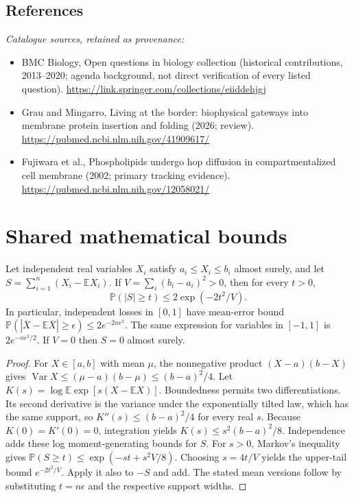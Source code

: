 \documentclass[11pt]{article}
\begin{document}
\subsection{References}
\noindent\emph{Catalogue sources, retained as provenance:}
\begin{itemize}
\item BMC Biology, Open questions in biology collection (historical contributions, 2013--2020; agenda background, not direct verification of every listed question). \url{https://link.springer.com/collections/eiiddehjgj}
\item Grau and Mingarro, Living at the border: biophysical gateways into membrane protein insertion and folding (2026; review). \url{https://pubmed.ncbi.nlm.nih.gov/41909617/}
\item Fujiwara et al., Phospholipids undergo hop diffusion in compartmentalized cell membrane (2002; primary tracking evidence). \url{https://pubmed.ncbi.nlm.nih.gov/12058021/}
\end{itemize}




\section{Shared mathematical bounds}\label{app:bounds}
\begin{lemma}\label{lem:bounded}
Let independent real variables $X_i$ satisfy $a_i\leq X_i\leq b_i$ almost surely,
and let $S=\sum_{i=1}^n(X_i-\mathbb{E} X_i)$. If
$V=\sum_i(b_i-a_i)^2>0$, then for every $t>0$,
\[
 \mathbb{P}(|S|\geq t)\leq 2\exp(-2t^2/V).
\]
In particular, independent losses in $[0,1]$ have mean-error bound
$\mathbb{P}(|\overline X-\mathbb{E}\overline X|\geq\epsilon)
\leq2e^{-2n\epsilon^2}$. The same expression for variables in $[-1,1]$
is $2e^{-n\epsilon^2/2}$. If $V=0$ then $S=0$ almost surely.
\end{lemma}
\begin{proof}
For $X\in[a,b]$ with mean $\mu$, the nonnegative product
$(X-a)(b-X)$ gives
$\operatorname{Var} X\leq(\mu-a)(b-\mu)\leq(b-a)^2/4$.
Let $K(s)=\log\mathbb{E}\exp[s(X-\mathbb{E} X)]$.
Boundedness permits two differentiations. Its second derivative is the variance
under the exponentially tilted law, which has the same support, so
$K''(s)\leq(b-a)^2/4$ for every real $s$.
Because $K(0)=K'(0)=0$, integration yields
$K(s)\leq s^2(b-a)^2/8$.
Independence adds these log moment-generating bounds for $S$.
For $s>0$, Markov's inequality gives
$\mathbb{P}(S\geq t)\leq\exp(-st+s^2V/8)$.
Choosing $s=4t/V$ yields the upper-tail bound $e^{-2t^2/V}$.
Apply it also to $-S$ and add. The stated mean versions follow by substituting
$t=n\epsilon$ and the respective support widths.
\end{proof}
\end{document}
